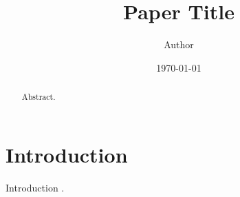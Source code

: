 \documentclass{article}
\title{Paper Title}
\author{Author}
\date{\today}
\begin{document}
\maketitle

\begin{abstract}
Abstract.
\end{abstract}

\section{Introduction}\label{sec:intro}
Introduction \cite{example}.



\end{document}

